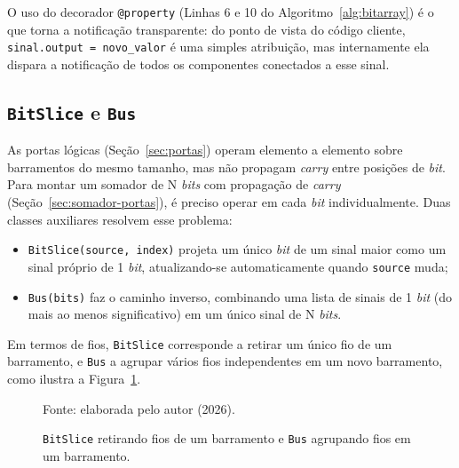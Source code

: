 O uso do decorador \texttt{@property} (Linhas 6 e 10 do Algoritmo~\ref{alg:bitarray}) é o que torna a notificação transparente: do ponto de vista do código cliente, \texttt{sinal.output = novo\_valor} é uma simples atribuição, mas internamente ela dispara a notificação de todos os componentes conectados a esse sinal.

\subsection{\texttt{BitSlice} e \texttt{Bus}}

As portas lógicas (Seção~\ref{sec:portas}) operam elemento a elemento sobre barramentos do mesmo tamanho, mas não propagam \textit{carry} entre posições de \textit{bit}. Para montar um somador de N \textit{bits} com propagação de \textit{carry} (Seção~\ref{sec:somador-portas}), é preciso operar em cada \textit{bit} individualmente. Duas classes auxiliares resolvem esse problema:

\begin{itemize}
    \item \texttt{BitSlice(source, index)} projeta um único \textit{bit} de um sinal maior como um sinal próprio de 1 \textit{bit}, atualizando-se automaticamente quando \texttt{source} muda;
    \item \texttt{Bus(bits)} faz o caminho inverso, combinando uma lista de sinais de 1 \textit{bit} (do mais ao menos significativo) em um único sinal de N \textit{bits}.
\end{itemize}

Em termos de fios, \texttt{BitSlice} corresponde a retirar um único fio de um barramento, e \texttt{Bus} a agrupar vários fios independentes em um novo barramento, como ilustra a Figura~\ref{fig:bitslice-bus}.

\begin{figure}[H]
\centering
\caption{\texttt{BitSlice} retirando fios de um barramento e \texttt{Bus} agrupando fios em um barramento.}
\label{fig:bitslice-bus}
\begin{center}
\footnotesize Fonte: elaborada pelo autor (2026).
\end{center}
\end{figure}

